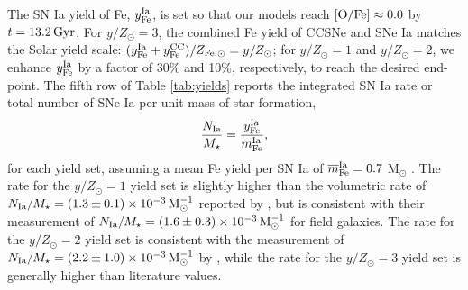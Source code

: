 \documentclass[twocolumn,twocolappendix,linenumbers]{aastex631}
\newcommand{\mathOFe}{{\rm [O/Fe]}}
\newcommand{\yZ}[1]{$y/Z_\odot=#1$}
\begin{document}
The SN Ia yield of Fe, $y_{\rm Fe}^{\rm Ia}$, is set so that our models reach $\mathOFe\approx0.0$ by $t=13.2\,{\rm Gyr}$. For \yZ{3}, the combined Fe yield of CCSNe and SNe Ia matches the Solar yield scale: $(y_{\rm Fe}^{\rm Ia}+y_{\rm Fe}^{\rm CC})/Z_{\rm Fe,\odot}=y/Z_\odot$; for \yZ{1} and \yZ{2}, we enhance $y_{\rm Fe}^{\rm Ia}$ by a factor of 30\% and 10\%, respectively, to reach the desired end-point. The fifth row of Table \ref{tab:yields} reports the integrated SN Ia rate or total number of SNe Ia per unit mass of star formation,
\begin{equation}
    \frac{N_{\rm Ia}}{M_\star} = \frac{y_{\rm Fe}^{\rm Ia}}{\bar m_{\rm Fe}^{\rm Ia}},
    \label{eq:snia-rate}
\end{equation}
for each yield set, assuming a mean Fe yield per SN Ia of $\overline m_{\rm Fe}^{\rm Ia}=0.7$ M$_\odot$ \citep{mazzali_common_2007,howell_effect_2009}. The rate for the \yZ{1} yield set is slightly higher than the volumetric rate of $N_{\rm Ia}/M_\star=(1.3\pm0.1)\times10^{-3}\,{\rm M}_\odot^{-1}$ reported by \citet{maoz_star_2017}, but is consistent with their measurement of $N_{\rm Ia}/M_\star=(1.6\pm0.3)\times10^{-3}\,{\rm M}_\odot^{-1}$ for field galaxies. The rate for the \yZ{2} yield set is consistent with the measurement of $N_{\rm Ia}/M_\star=(2.2\pm1.0)\times10^{-3}\,{\rm M}_\odot^{-1}$ by \citet{maoz_type-ia_2012}, while the rate for the \yZ{3} yield set is generally higher than literature values.
\end{document}
